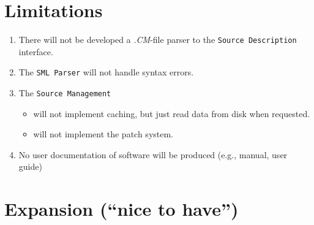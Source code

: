 \documentclass[a4paper,oneside]{memoir}
\begin{document}
\section{Limitations}

\begin{enumerate}
\item There will not be developed a \textit{.CM}-file parser to the
  \texttt{Source Description} interface.

\item The \texttt{SML Parser} will not handle syntax errors.

\item The \texttt{Source Management} 

  \begin{itemize}
  \item will not implement caching, but just read data from disk when
    requested.

  \item will not implement the patch system.
  \end{itemize}

\item No user documentation of software will be produced (e.g.,
  manual, user guide)
\end{enumerate}


\section{Expansion (``nice to have'')}
\end{document}
